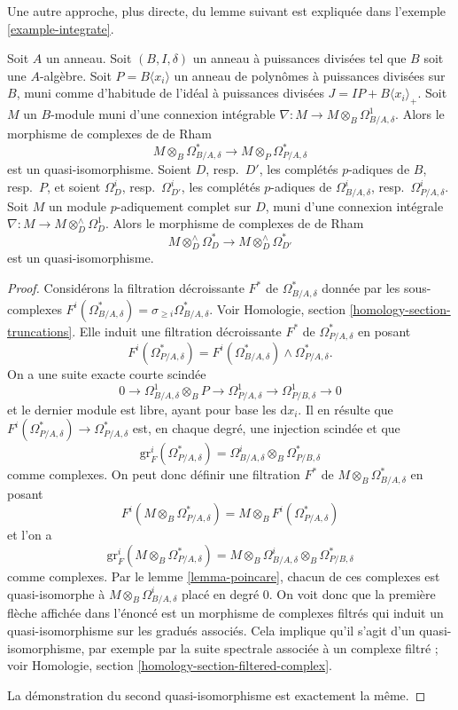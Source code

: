 \noindent
Une autre approche, plus directe, du lemme suivant est
expliquée dans l'exemple \ref{example-integrate}.

\begin{lemma}
\label{lemma-relative-poincare}
Soit $A$ un anneau. Soit $(B, I, \delta)$ un anneau à puissances divisées
tel que $B$ soit une $A$-algèbre.
Soit $P = B\langle x_i \rangle$ un anneau de polynômes à puissances divisées
sur $B$, muni comme d'habitude de l'idéal à puissances divisées $J = IP + B\langle x_i \rangle_{+}$.
Soit $M$ un $B$-module muni d'une connexion intégrable
$\nabla : M \to M \otimes_B \Omega^1_{B/A, \delta}$. Alors le morphisme de
complexes de de Rham
$$
M \otimes_B \Omega^*_{B/A, \delta}
\longrightarrow
M \otimes_P \Omega^*_{P/A, \delta}
$$
est un quasi-isomorphisme. Soient $D$, resp.\ $D'$, les complétés $p$-adiques de
$B$, resp.\ $P$, et soient $\Omega^i_D$, resp.\ $\Omega^i_{D'}$, les complétés $p$-adiques
de $\Omega^i_{B/A, \delta}$,
resp.\ $\Omega^i_{P/A, \delta}$. Soit $M$ un module $p$-adiquement complet
sur $D$, muni d'une connexion intégrale
$\nabla : M \to M \otimes^\wedge_D \Omega^1_D$.
Alors le morphisme de complexes de de Rham
$$
M \otimes^\wedge_D \Omega^*_D
\longrightarrow
M \otimes^\wedge_D \Omega^*_{D'}
$$
est un quasi-isomorphisme.
\end{lemma}

\begin{proof}
Considérons la filtration décroissante $F^*$ de $\Omega^*_{B/A, \delta}$
donnée par les sous-complexes
$F^i(\Omega^*_{B/A, \delta}) = \sigma_{\geq i}\Omega^*_{B/A, \delta}$.
Voir Homologie, section \ref{homology-section-truncations}.
Elle induit une filtration décroissante $F^*$ de $\Omega^*_{P/A, \delta}$
en posant
$$
F^i(\Omega^*_{P/A, \delta}) =
F^i(\Omega^*_{B/A, \delta}) \wedge \Omega^*_{P/A, \delta}.
$$
On a une suite exacte courte scindée
$$
0 \to \Omega^1_{B/A, \delta} \otimes_B P \to
\Omega^1_{P/A, \delta} \to
\Omega^1_{P/B, \delta} \to 0
$$
et le dernier module est libre, ayant pour base les $\text{d}x_i$. Il en résulte que
$F^i(\Omega^*_{P/A, \delta}) \to \Omega^*_{P/A, \delta}$ est, en chaque degré, une
injection scindée et que
$$
\text{gr}^i_F(\Omega^*_{P/A, \delta}) =
\Omega^i_{B/A, \delta} \otimes_B \Omega^*_{P/B, \delta}
$$
comme complexes. On peut donc définir une filtration $F^*$ de
$M \otimes_B \Omega^*_{B/A, \delta}$ en posant
$$
F^i(M \otimes_B \Omega^*_{P/A, \delta}) =
M \otimes_B F^i(\Omega^*_{P/A, \delta})
$$
et l'on a
$$
\text{gr}^i_F(M \otimes_B \Omega^*_{P/A, \delta}) =
M \otimes_B \Omega^i_{B/A, \delta} \otimes_B \Omega^*_{P/B, \delta}
$$
comme complexes.
Par le lemme \ref{lemma-poincare}, chacun de ces complexes est
quasi-isomorphe à $M \otimes_B \Omega^i_{B/A, \delta}$ placé en degré $0$.
On voit donc que la première flèche affichée dans l'énoncé est un morphisme de
complexes filtrés qui induit un quasi-isomorphisme sur les gradués associés. Cela
implique qu'il s'agit d'un quasi-isomorphisme, par exemple par la suite spectrale
associée à un complexe filtré ; voir
Homologie, section \ref{homology-section-filtered-complex}.

\medskip\noindent
La démonstration du second quasi-isomorphisme est exactement la même.
\end{proof}



